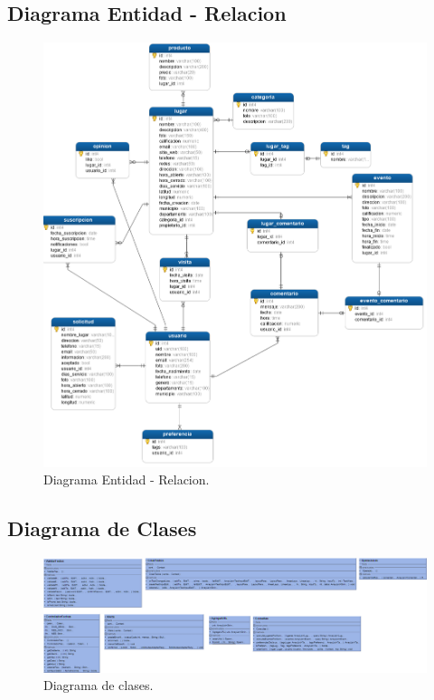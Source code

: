 \documentclass[12pt,letterpaper,openany]{book}
\begin{document}
\subsection{Diagrama Entidad - Relacion}
\begin{figure}[H]
\begin{center}
\includegraphics[width=16cm]{./imagenes/Diagrama_entidad_relacion}
\caption{Diagrama Entidad - Relacion.}
\end{center}
\end{figure}

\subsection{Diagrama de Clases}
\begin{figure}[H]
\begin{center}
\includegraphics[width=16cm]{./imagenes/diagrama_clases}
\caption{Diagrama de clases.}
\end{center}
\end{figure}
\end{document}
